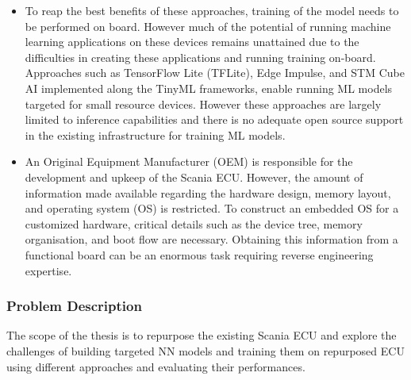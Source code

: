\begin{itemize}
	\item To reap the best benefits of these approaches, training of the model needs to be performed on board. However much of the potential of running machine learning applications on these devices remains unattained due to the difficulties in creating these applications and running training on-board. Approaches such as TensorFlow Lite (TFLite), Edge Impulse, and STM Cube AI implemented along the TinyML frameworks, enable running ML models targeted for small resource devices. However these approaches are largely limited to inference capabilities and there is no adequate open source support in the existing infrastructure for training ML models.
	\item An Original Equipment Manufacturer (OEM) is responsible for the development and upkeep of the Scania ECU. However, the amount of information made available regarding the hardware design, memory layout, and operating system (OS) is restricted. To construct an embedded OS for a customized hardware, critical details such as the device tree, memory organisation, and boot flow are necessary. Obtaining this information from a functional board can be an enormous task requiring reverse engineering expertise.
\end{itemize}




\subsubsection{Problem Description}

The scope of the thesis is to repurpose the existing Scania ECU and explore the challenges of building targeted NN models and training them on repurposed ECU using different approaches and evaluating their performances.

